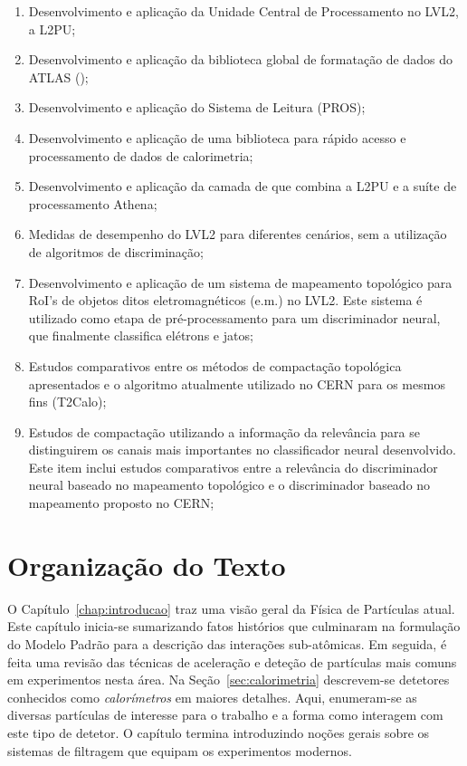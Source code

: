 \begin{enumerate}
\item Desenvolvimento e aplicação da Unidade Central de Processamento no
LVL2, a L2PU;
\item Desenvolvimento e aplicação da biblioteca global de formatação de dados
do ATLAS ();
\item Desenvolvimento e aplicação do  Sistema de Leitura (PROS);
\item Desenvolvimento e aplicação de uma biblioteca para rápido acesso e
processamento de dados de calorimetria;
\item Desenvolvimento e aplicação da camada de  que combina a
L2PU e a suíte de processamento  Athena;
\item Medidas de desempenho do LVL2 para diferentes cenários, sem a utilização
de algoritmos de discriminação;
\item Desenvolvimento e aplicação de um sistema de mapeamento topológico para
RoI's de objetos ditos eletromagnéticos (e.m.) no LVL2. Este sistema é
utilizado como etapa de pré-processamento para um discriminador neural, que
finalmente classifica elétrons e jatos;
\item Estudos comparativos entre os métodos de compactação topológica
apresentados e o algoritmo atualmente utilizado no CERN para os mesmos fins
(T2Calo); 
\item Estudos de compactação utilizando a informação da relevância para se
distinguirem os canais mais importantes no classificador neural
desenvolvido. Este item inclui estudos comparativos entre a relevância do
discriminador neural baseado no mapeamento topológico e o discriminador
baseado no mapeamento proposto no CERN;
\end{enumerate}

\section{Organização do Texto}

O Capítulo~\ref{chap:introducao} traz uma visão geral da Física de Partículas
atual. Este capítulo inicia-se sumarizando fatos histórios que culminaram na
formulação do Modelo Padrão para a descrição das interações sub-atômicas. Em
seguida, é feita uma revisão das técnicas de aceleração e deteção de
partículas mais comuns em experimentos nesta área. Na
Seção~\ref{sec:calorimetria} descrevem-se detetores conhecidos como
\textit{calorímetros} em maiores detalhes. Aqui, enumeram-se as diversas
partículas de interesse para o trabalho e a forma como interagem com este tipo
de detetor. O capítulo termina introduzindo noções gerais sobre os sistemas de
filtragem que equipam os experimentos modernos.

